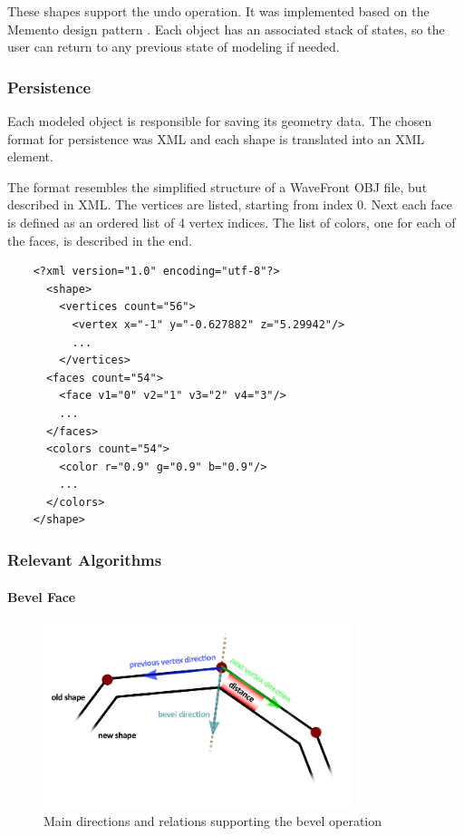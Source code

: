 These shapes support the undo operation. It was implemented based on the Memento design pattern \cite{despat}.
Each object has an associated stack of states, so the user can return to any previous state of modeling if needed.


\subsubsection{Persistence}
\label{sec:shape-persistence}

Each modeled object is responsible for saving its geometry data.
The chosen format for persistence was XML and each shape is translated into an XML element.

The format resembles the simplified structure of a WaveFront OBJ file, but described in XML.
The vertices are listed, starting from index 0.
Next each face is defined as an ordered list of 4 vertex indices.
The list of colors, one for each of the faces, is described in the end.

\begin{small}
	\begin{verbatim}
	<?xml version="1.0" encoding="utf-8"?>
	  <shape>
	    <vertices count="56">
	      <vertex x="-1" y="-0.627882" z="5.29942"/>
	      ...
	    </vertices>
	  <faces count="54">
	    <face v1="0" v2="1" v3="2" v4="3"/>
	    ...
	  </faces>
	  <colors count="54">
	    <color r="0.9" g="0.9" b="0.9"/>
	    ...
	  </colors>
	</shape>
	\end{verbatim}
\end{small}


\subsubsection{Relevant Algorithms}

\paragraph{Bevel Face}

\begin{figure}[!ht]
    \centering
    \includegraphics[width=9cm]{gfx/bevel.png}
    \vspace{-1cm}
    \caption{Main directions and relations supporting the bevel operation}
    \label{FIG-GS-BEVEL}
\end{figure}

